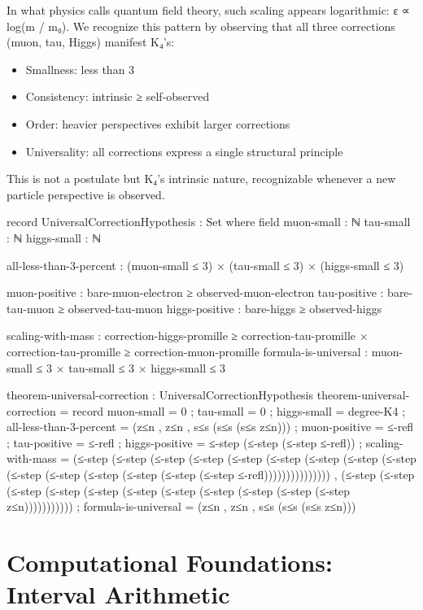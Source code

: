 \documentclass[11pt,a4paper]{book}
\begin{document}
In what physics calls quantum field theory, such scaling appears logarithmic: ε ∝ log(m / m₀).
We recognize this pattern by observing that all three corrections (muon, tau, Higgs) manifest K₄'s:
\begin{itemize}
\item Smallness: less than 3%
\item Consistency: intrinsic ≥ self-observed
\item Order: heavier perspectives exhibit larger corrections  
\item Universality: all corrections express a single structural principle
\end{itemize}

This is not a postulate but K₄'s intrinsic nature, recognizable whenever a new particle perspective is observed.

\begin{code}
record UniversalCorrectionHypothesis : Set where
  field
    muon-small : ℕ
    tau-small : ℕ
    higgs-small : ℕ
    
    all-less-than-3-percent : (muon-small ≤ 3) × (tau-small ≤ 3) × (higgs-small ≤ 3)
    
    muon-positive : bare-muon-electron ≥ observed-muon-electron
    tau-positive : bare-tau-muon ≥ observed-tau-muon
    higgs-positive : bare-higgs ≥ observed-higgs
    
    scaling-with-mass : correction-higgs-promille ≥ correction-tau-promille ×
                        correction-tau-promille ≥ correction-muon-promille
    formula-is-universal : muon-small ≤ 3 × tau-small ≤ 3 × higgs-small ≤ 3

theorem-universal-correction : UniversalCorrectionHypothesis
theorem-universal-correction = record
  { muon-small = 0
  ; tau-small = 0
  ; higgs-small = degree-K4
  ; all-less-than-3-percent = (z≤n , z≤n , s≤s (s≤s (s≤s z≤n)))
  ; muon-positive = ≤-refl
  ; tau-positive = ≤-refl
  ; higgs-positive = ≤-step (≤-step (≤-step ≤-refl))
  ; scaling-with-mass = (≤-step (≤-step (≤-step (≤-step (≤-step (≤-step (≤-step (≤-step (≤-step (≤-step (≤-step (≤-step (≤-step (≤-step (≤-step ≤-refl))))))))))))))) , 
                         (≤-step (≤-step (≤-step (≤-step (≤-step (≤-step (≤-step (≤-step (≤-step (≤-step (≤-step z≤n)))))))))))
  ; formula-is-universal = (z≤n , z≤n , s≤s (s≤s (s≤s z≤n)))
  }
\end{code}

\chapter{Computational Foundations: Interval Arithmetic}
\end{document}
